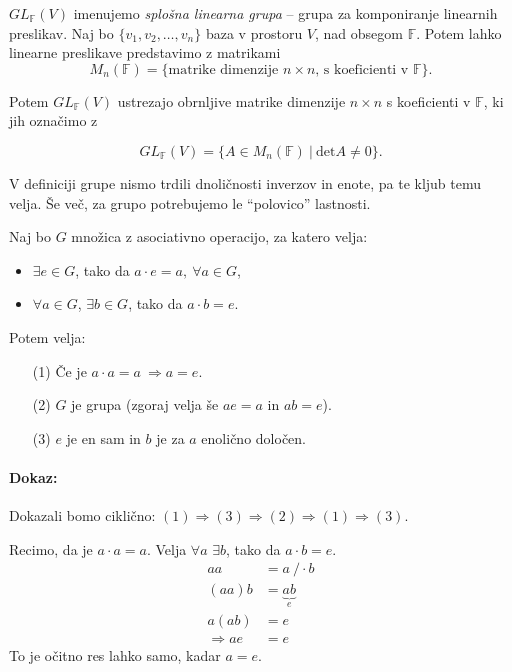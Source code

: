 $GL_{\mathbb{F}}(V)$ imenujemo \emph{splo\v sna linearna grupa} -- grupa za komponiranje linearnih preslikav. Naj bo $\{v_1, v_2, \ldots, v_n\}$ baza
v prostoru $V$, nad obsegom $\mathbb{F}$. Potem lahko linearne preslikave predstavimo z matrikami
\[
	M_n (\mathbb{F}) = \{\text{matrike dimenzije $n\times n$, s koeficienti v $\mathbb{F}$}\}.
\]

\ni Potem $GL_{\mathbb{F}}(V)$ ustrezajo obrnljive matrike dimenzije $n\times n$ s koeficienti v $\mathbb{F}$, ki jih ozna\v cimo z

\[
	GL_{\mathbb{F}}(V) = \{A \in M_n (\mathbb{F})\ |\ \text{det}A \neq 0\}.
\]

V definiciji grupe nismo trdili dnoli\v cnosti inverzov in enote, pa te kljub temu velja. \v Se ve\v c, za grupo potrebujemo le "`polovico"' lastnosti.

\pagebreak

\begin{trditev}
	Naj bo $G$ mno\v zica z asociativno operacijo, za katero velja:
	\begin{itemize}
		\item{$\exists e \in G$, tako da $a\cdot e = a,\ \forall a \in G$,}
		\item{$\forall a \in G$, $\exists b \in G$, tako da $a\cdot b = e$.}
	\end{itemize}
	\ni Potem velja:
	\begin{itemize}
		\item[(1)]{\v Ce je $a\cdot a = a\ \Rightarrow a = e$.}
		\item[(2)]{$G$ je grupa (zgoraj velja \v se $ae = a$ in $ab = e$).}
		\item[(3)]{$e$ je en sam in $b$ je za $a$ enoli\v cno dolo\v cen.}
	\end{itemize}
\end{trditev}

\paragraph{Dokaz:}

Dokazali bomo cikli\v cno: $(1) \Rightarrow (3) \Rightarrow (2) \Rightarrow (1) \Rightarrow (3)$.

 Recimo, da je $a\cdot a = a$. Velja $\forall a$ $\exists b$, tako da $a\cdot b = e$.
\begin{align*}
	aa &= a\ / \cdot b \\
	(aa) b &= \underbrace{ab}_e \\
	a (ab) &= e \\
	\Rightarrow ae &= e
\end{align*}
To je o\v citno res lahko samo, kadar $a = e$.

